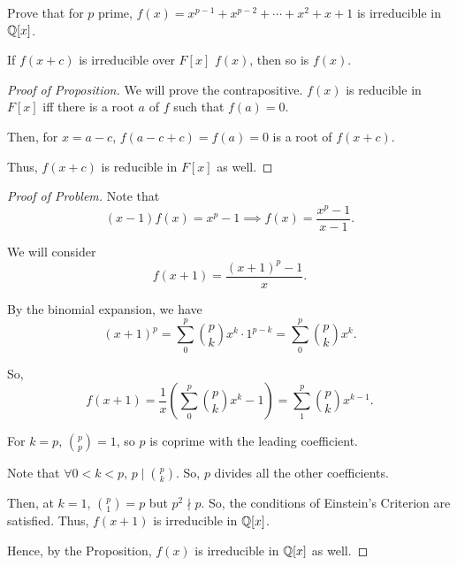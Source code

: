 \documentclass[../hw6]{subfiles}
\begin{document}
\begin{problem}
Prove that for $p$ prime,  $f(x)=x^{p-1}+x^{p-2}+\cdots+x^2 + x + 1$ is irreducible in $\mathbb{Q}[x]$.
\end{problem}
\begin{proposition}
	If $f(x+c)$ is irreducible over $F[x]$ $f(x)$, then so is $f(x)$.
\end{proposition}
\begin{proof}[Proof of Proposition]
	We will prove the contrapositive.
	$f(x)$ is reducible in  $F[x]$ iff there is a root $a$ of $f$ such that  $f(a)=0$.

	Then,  for $x=a-c$, $f(a-c+c)=f(a)=0$ is a root of $f(x+c)$.

	Thus, $f(x+c)$ is reducible in $F[x]$ as well.
\end{proof}
\begin{proof}[Proof of Problem]
	Note that \[
		(x-1)f(x)=x^p-1 \implies f(x)=  \frac{x^p-1}{x-1}
		.\]

	We will consider \[
		f(x+1)=\frac{(x+1)^p-1}{x}
		.\]

	By the binomial expansion, we have \[
		(x+1)^p = \sum_{0}^{p} \binom{p}{k} x^k \cdot 1^{p-k} = \sum_{0}^{p} \binom{p}{k} x^k
		.\]

	So, \[
		f(x+1)=\frac{1}{x}\left( \sum_{0}^{p} \binom{p}{k} x^k - 1 \right) = \sum_{1}^{p} \binom{p}{k} x^{k-1}
		.\]

	For $k=p$,  $\binom{p}{p} = 1$, so $p$ is coprime with the leading coefficient.

	Note that $\forall 0<k<p,\, p\mid \binom{p}{k}$.
	So, $p$ divides all the other coefficients.

	Then, at $k=1$, $\binom{p}{1} = p$ but $p^2\nmid p$.
	So, the conditions of Einstein's Criterion are satisfied.
	Thus, $f(x+1)$ is irreducible in  $\mathbb{Q}[x]$.

	Hence, by the Proposition, $f(x)$ is irreducible in  $\mathbb{Q}[x]$ as well.
\end{proof}
\end{document}
